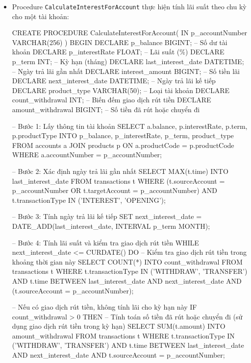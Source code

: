 \begin{itemize}
    \newpage
    
    \item Procedure \texttt{CalculateInterestForAccount} thực hiện tính lãi suất theo chu kỳ cho một tài khoản:
    \begin{MySQLCode}
    CREATE PROCEDURE CalculateInterestForAccount(
        IN p_accountNumber VARCHAR(256)
    )
    BEGIN
        DECLARE p_balance BIGINT;               -- Số dư tài khoản
        DECLARE p_interestRate FLOAT;           -- Lãi suất (\%)
        DECLARE p_term INT;                     -- Kỳ hạn (tháng)
        DECLARE last_interest_date DATETIME;    -- Ngày trả lãi gần nhất
        DECLARE interest_amount BIGINT;         -- Số tiền lãi
        DECLARE next_interest_date DATETIME;    -- Ngày trả lãi kế tiếp
        DECLARE product_type VARCHAR(50);       -- Loại tài khoản
        DECLARE count_withdrawal INT;           -- Biến đếm giao dịch rút tiền
        DECLARE amount_withdrawal BIGINT;       -- Số tiền đã rút hoặc chuyển đi

        -- Bước 1: Lấy thông tin tài khoản
        SELECT a.balance, p.interestRate, p.term, p.productType
        INTO p_balance, p_interestRate, p_term, product_type
        FROM accounts a
        JOIN products p ON a.productCode = p.productCode
        WHERE a.accountNumber = p_accountNumber;

        -- Bước 2: Xác định ngày trả lãi gần nhất
        SELECT MAX(t.time)
        INTO last_interest_date
        FROM transactions t
        WHERE (t.sourceAccount = p_accountNumber OR t.targetAccount = p_accountNumber)
            AND t.transactionType IN ('INTEREST', 'OPENING');

        -- Bước 3: Tính ngày trả lãi kế tiếp
        SET next_interest_date = DATE_ADD(last_interest_date, INTERVAL p_term MONTH);

        -- Bước 4: Tính lãi suất và kiểm tra giao dịch rút tiền
        WHILE next_interest_date <= CURDATE() DO
            -- Kiểm tra giao dịch rút tiền trong khoảng thời gian này
            SELECT COUNT(*)
            INTO count_withdrawal
            FROM transactions t
            WHERE t.transactionType IN ('WITHDRAW', 'TRANSFER')
                AND t.time BETWEEN last_interest_date AND next_interest_date
                AND (t.sourceAccount = p_accountNumber);

            -- Nếu có giao dịch rút tiền, không tính lãi cho kỳ hạn này
            IF count_withdrawal > 0 THEN
                -- Tính toán số tiền đã rút hoặc chuyển đi (sử dụng giao dịch rút tiền trong kỳ hạn)
                SELECT SUM(t.amount)
                INTO amount_withdrawal
                FROM transactions t
                WHERE t.transactionType IN ('WITHDRAW', 'TRANSFER')
                    AND t.time BETWEEN last_interest_date AND next_interest_date
                    AND t.sourceAccount = p_accountNumber;


\end{MySQLCode}
\end{itemize}
